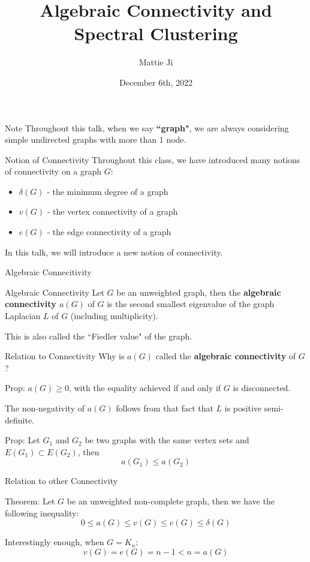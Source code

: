 \documentclass[hyperref, notheorems]{beamer}
\title{Algebraic Connectivity and Spectral Clustering}
\author{Mattie Ji}
\institute{APMA 2812G - Combinatorial Theory}
\date{December 6th, 2022}
\theoremstyle{definition}
\begin{document}
\begin{frame}
    \titlepage
\end{frame}

\begin{frame}{Note}
    Throughout this talk, when we say \textbf{``graph"}, we are always considering simple undirected graphs with more than $1$ node.
\end{frame}

\begin{frame}{Notion of Connectivity}
   Throughout this class, we have introduced many notions of connectivity on a graph $G$:
   \begin{itemize}
       \item $\delta(G)$ - the minimum degree of a graph
       \item $v(G)$ - the vertex connectivity of a graph
       \item $e(G)$ - the edge connectivity of a graph
   \end{itemize}
   In this talk, we will introduce a new notion of connectivity.
\end{frame}

\begin{frame}{Algebraic Connecitivity}
\begin{block}{Algebraic Connectivity}
    Let $G$ be an unweighted graph, then the \textbf{algebraic connectivity $a(G)$} of $G$ is the second smallest eigenvalue of the graph Laplacian $L$ of $G$ (including multiplicity).
\end{block}
This is also called the ``Fiedler value" of the graph.

\end{frame}

\begin{frame}{Relation to Connectivity}
Why is $a(G)$ called the \textbf{algebraic connectivity} of $G$?
  \begin{block}{Prop: }
    $a(G) \geq 0$, with the equality achieved if and only if $G$ is disconnected.
\end{block}
The non-negativity of $a(G)$ follows from that fact that $L$ is positive semi-definite.
\begin{block}{Prop: }
    Let $G_1$ and $G_2$ be two graphs with the same vertex sets and $E(G_1) \subset E(G_2)$, then
    \[a(G_1) \leq a(G_2)\]
\end{block}
\end{frame}

\begin{frame}{Relation to other Connectivity}

\begin{block}{Theorem: }
Let $G$ be an unweighted non-complete graph, then we have the following inequality:
\[0 \leq a(G) \leq v(G) \leq e(G) \leq \delta(G)\]
\end{block}

Interestingly enough, when $G = K_n$:
\[v(G) = e(G) = n - 1 < n = a(G)\]
\end{frame}
\end{document}

